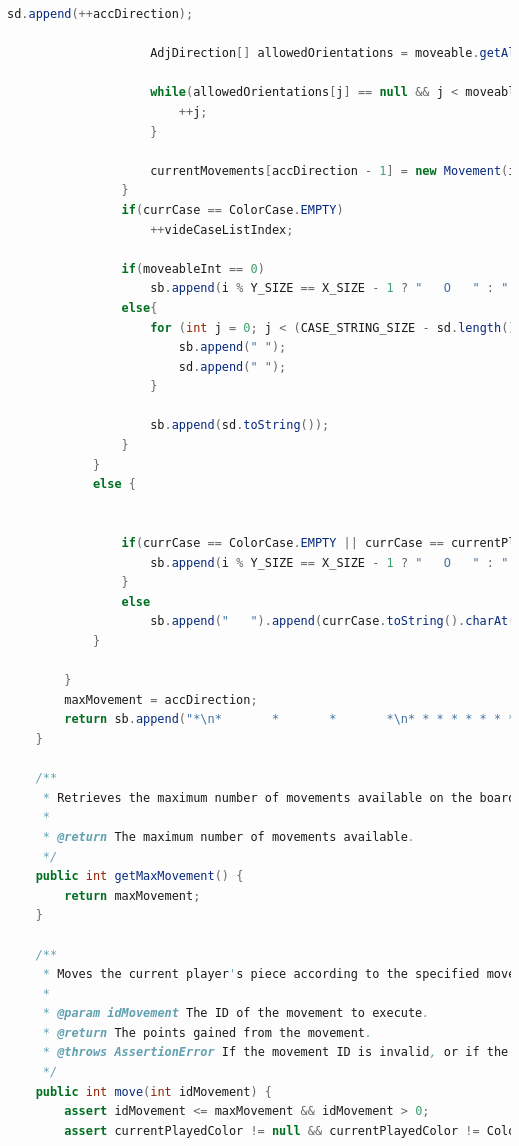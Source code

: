 \documentclass[a4paper,11pt]{article}
\begin{document}
\begin{lstlisting}[language=Java, breaklines=true]
                    sd.append(++accDirection);
                    
                    AdjDirection[] allowedOrientations = moveable.getAllOrientations();
                    
                    while(allowedOrientations[j] == null && j < moveableInt) {
                        ++j;
                    }

                    currentMovements[accDirection - 1] = new Movement(i, allowedOrientations[j]);
                }
                if(currCase == ColorCase.EMPTY)
                    ++videCaseListIndex;

                if(moveableInt == 0)
                    sb.append(i % Y_SIZE == X_SIZE - 1 ? "   O   " : "       ");
                else{
                    for (int j = 0; j < (CASE_STRING_SIZE - sd.length())/2 + 1; ++j) {
                        sb.append(" ");
                        sd.append(" ");
                    }

                    sb.append(sd.toString());
                }
            }
            else {
                

                if(currCase == ColorCase.EMPTY || currCase == currentPlayedColor) {
                    sb.append(i % Y_SIZE == X_SIZE - 1 ? "   O   " : "       ");
                }
                else
                    sb.append("   ").append(currCase.toString().charAt(0)).append("   ");
            }

        }
        maxMovement = accDirection;
        return sb.append("*\n*       *       *       *\n* * * * * * * * * * * * *\n").toString();
    }

    /**
     * Retrieves the maximum number of movements available on the board.
     *
     * @return The maximum number of movements available.
     */
    public int getMaxMovement() {
        return maxMovement;
    }
    
    /**
     * Moves the current player's piece according to the specified movement ID and updates the board accordingly. Use After getAllMovement !
     *
     * @param idMovement The ID of the movement to execute.
     * @return The points gained from the movement.
     * @throws AssertionError If the movement ID is invalid, or if the current played color is null or empty.
     */
    public int move(int idMovement) {
        assert idMovement <= maxMovement && idMovement > 0;
        assert currentPlayedColor != null && currentPlayedColor != ColorCase.EMPTY;


\end{lstlisting}
\end{document}
